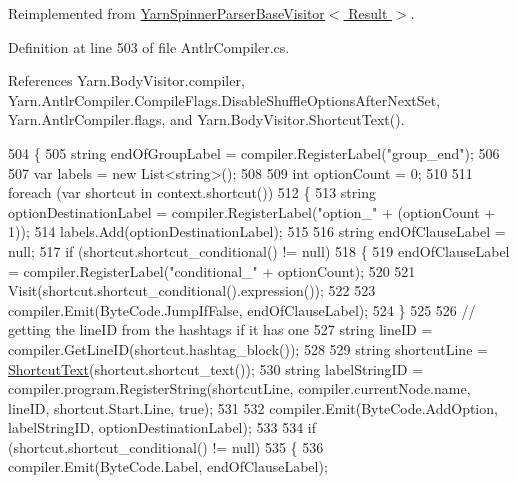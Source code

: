 Reimplemented from \hyperlink{a00199_a8299d25bc796f9c126635cf72aa3ea12}{Yarn\-Spinner\-Parser\-Base\-Visitor$<$ Result $>$}.



Definition at line 503 of file Antlr\-Compiler.\-cs.



References Yarn.\-Body\-Visitor.\-compiler, Yarn.\-Antlr\-Compiler.\-Compile\-Flags.\-Disable\-Shuffle\-Options\-After\-Next\-Set, Yarn.\-Antlr\-Compiler.\-flags, and Yarn.\-Body\-Visitor.\-Shortcut\-Text().


\begin{DoxyCode}
504         \{
505             \textcolor{keywordtype}{string} endOfGroupLabel = compiler.RegisterLabel(\textcolor{stringliteral}{"group\_end"});
506 
507             var labels = \textcolor{keyword}{new} List<string>();
508 
509             \textcolor{keywordtype}{int} optionCount = 0;
510 
511             \textcolor{keywordflow}{foreach} (var shortcut \textcolor{keywordflow}{in} context.shortcut())
512             \{
513                 \textcolor{keywordtype}{string} optionDestinationLabel = compiler.RegisterLabel(\textcolor{stringliteral}{"option\_"} + (optionCount + 1));
514                 labels.Add(optionDestinationLabel);
515 
516                 \textcolor{keywordtype}{string} endOfClauseLabel = null;
517                 \textcolor{keywordflow}{if} (shortcut.shortcut\_conditional() != null)
518                 \{
519                     endOfClauseLabel = compiler.RegisterLabel(\textcolor{stringliteral}{"conditional\_"} + optionCount);
520 
521                     Visit(shortcut.shortcut\_conditional().expression());
522 
523                     compiler.Emit(ByteCode.JumpIfFalse, endOfClauseLabel);
524                 \}
525 
526                 \textcolor{comment}{// getting the lineID from the hashtags if it has one}
527                 \textcolor{keywordtype}{string} lineID = compiler.GetLineID(shortcut.hashtag\_block());
528 
529                 \textcolor{keywordtype}{string} shortcutLine = \hyperlink{a00046_ad8448dacbbd94adebf38c29c3f50e499}{ShortcutText}(shortcut.shortcut\_text());
530                 \textcolor{keywordtype}{string} labelStringID = compiler.program.RegisterString(shortcutLine, 
      compiler.currentNode.name, lineID, shortcut.Start.Line, \textcolor{keyword}{true});
531 
532                 compiler.Emit(ByteCode.AddOption, labelStringID, optionDestinationLabel);
533 
534                 \textcolor{keywordflow}{if} (shortcut.shortcut\_conditional() != null)
535                 \{
536                     compiler.Emit(ByteCode.Label, endOfClauseLabel);

\end{DoxyCode}
